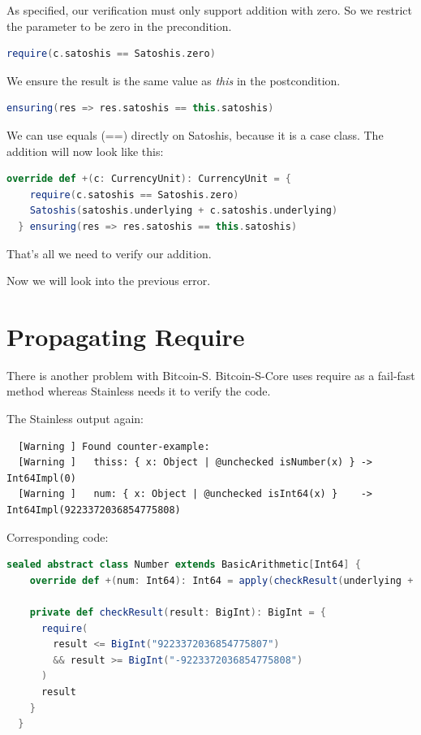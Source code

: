 As specified, our verification must only support addition with zero.
So we restrict the parameter to be zero in the precondition.
\begin{lstlisting}[language=scala]
  require(c.satoshis == Satoshis.zero)
\end{lstlisting}

We ensure the result is the same value as \emph{this} in the postcondition.
\begin{lstlisting}[language=scala]
  ensuring(res => res.satoshis == this.satoshis)
\end{lstlisting}

We can use equals (==) directly on Satoshis, because it is a case class.
The addition will now look like this:
\begin{lstlisting}[language=scala]
  override def +(c: CurrencyUnit): CurrencyUnit = {
    require(c.satoshis == Satoshis.zero)
    Satoshis(satoshis.underlying + c.satoshis.underlying)
  } ensuring(res => res.satoshis == this.satoshis)
\end{lstlisting}

That's all we need to verify our addition.

Now we will look into the previous error.


\section{Propagating Require}

There is another problem with Bitcoin-S.
Bitcoin-S-Core uses require as a fail-fast method whereas Stainless needs it to verify the code.

The Stainless output again:
{\footnotesize\begin{verbatim}
  [Warning ] Found counter-example:
  [Warning ]   thiss: { x: Object | @unchecked isNumber(x) } -> Int64Impl(0)
  [Warning ]   num: { x: Object | @unchecked isInt64(x) }    -> Int64Impl(9223372036854775808)
\end{verbatim}}

Corresponding code:
\begin{lstlisting}[language=scala]
  sealed abstract class Number extends BasicArithmetic[Int64] {
    override def +(num: Int64): Int64 = apply(checkResult(underlying + num.underlying))

    private def checkResult(result: BigInt): BigInt = {
      require(
        result <= BigInt("9223372036854775807")
        && result >= BigInt("-9223372036854775808")
      )
      result
    }
  }
\end{lstlisting}

